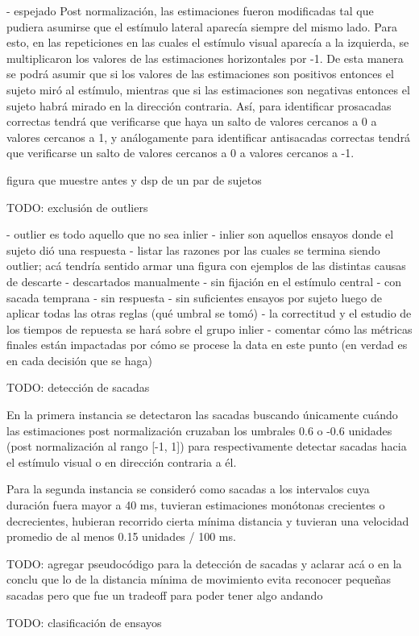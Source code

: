 - espejado
Post normalización, las estimaciones fueron modificadas tal que pudiera
asumirse que el estímulo lateral aparecía siempre del mismo lado.
Para esto, en las repeticiones en las cuales el estímulo visual aparecía a la
izquierda, se multiplicaron los valores de las estimaciones horizontales por
-1.
De esta manera se podrá asumir que si los valores de las estimaciones son
positivos entonces el sujeto miró al estímulo, mientras que si las estimaciones
son negativas entonces el sujeto habrá mirado en la dirección contraria.
Así, para identificar prosacadas correctas tendrá que verificarse que haya un
salto de valores cercanos a 0 a valores cercanos a 1, y análogamente para
identificar antisacadas correctas tendrá que verificarse un salto de valores
cercanos a 0 a valores cercanos a -1.

figura que muestre antes y dsp de un par de sujetos

TODO: exclusión de outliers

- outlier es todo aquello que no sea inlier
- inlier son aquellos ensayos donde el sujeto dió una respuesta 
- listar las razones por las cuales se termina siendo outlier; acá tendría
sentido armar una figura con ejemplos de las distintas causas de descarte
 - descartados manualmente
 - sin fijación en el estímulo central
 - con sacada temprana
 - sin respuesta
 - sin suficientes ensayos por sujeto luego de aplicar todas las otras reglas
 (qué umbral se tomó)
- la correctitud y el estudio de los tiempos de repuesta se hará sobre el
  grupo inlier
- comentar cómo las métricas finales están impactadas por cómo se procese la
  data en este punto (en verdad es en cada decisión que se haga)

TODO: detección de sacadas

En la primera instancia se detectaron las sacadas buscando únicamente cuándo
las estimaciones post normalización cruzaban los umbrales 0.6 o -0.6 unidades
(post normalización al rango [-1, 1]) para respectivamente detectar sacadas
hacia el estímulo visual o en dirección contraria a él.

Para la segunda instancia se consideró como sacadas a los intervalos cuya
duración fuera mayor a 40 ms, tuvieran estimaciones monótonas crecientes o
decrecientes, hubieran recorrido cierta mínima distancia y tuvieran una
velocidad promedio de al menos 0.15 unidades / 100 ms.

TODO: agregar pseudocódigo para la detección de sacadas y aclarar acá o en la
      conclu que lo de la distancia mínima de movimiento evita reconocer
      pequeñas sacadas pero que fue un tradeoff para poder tener algo andando


TODO: clasificación de ensayos

